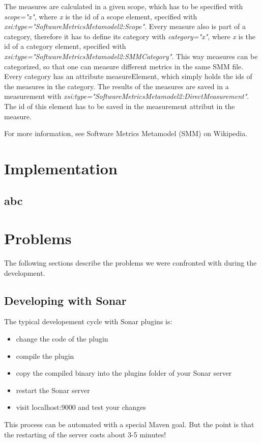 The measures are calculated in a given scope, which has to be specified with \textit{scope="x"}, where \textit{x} is the id of a scope element, specified with \textit{xsi:type="SoftwareMetricsMetamodel2:Scope"}. Every measure also is part of a category, therefore it has to define its category with \textit{category="x"}, where \textit{x} is the id of a category element, specified with \textit{xsi:type="SoftwareMetricsMetamodel2:SMMCategory"}. This way measures can be categorized, so that one can measure different metrics in the same SMM file. Every category has an attribute measureElement, which simply holds the ids of the measures in the category. The results of the measures are saved in a measurement with \textit{xsi:type="SoftwareMetricsMetamodel2:DirectMeasurement"}. The id of this element has to be saved in the measurement attribut in the measure.

For more information, see Software Metrics Metamodel (SMM) on Wikipedia.



\section{Implementation}
\subsection{abc}










\section{Problems}

The following sections describe the problems we were confronted with during the development.

\subsection{Developing with Sonar}
The typical developement cycle with Sonar plugins is:
\begin{itemize}
	\item change the code of the plugin
	\item compile the plugin
	\item copy the compiled binary into the plugins folder of your Sonar server
	\item restart the Sonar server
	\item visit localhost:9000 and test your changes
\end{itemize}
This process can be automated with a special Maven goal. But the point is that the restarting of the server costs about 3-5 minutes!

